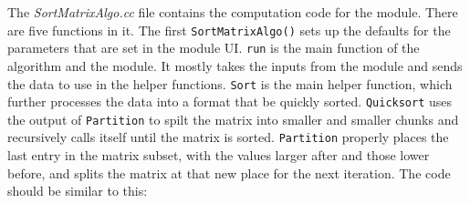 \documentclass[fleqn,11pt,openany]{book}
\begin{document}
The \emph{SortMatrixAlgo.cc} file contains the computation code for the module.
There are five functions in it.
The first \verb|SortMatrixAlgo()| sets up the defaults for the parameters that are set in the module UI.
\verb|run| is the main function of the algorithm and the module.  
It mostly takes the inputs from the module and sends the data to use in the helper functions.
\verb|Sort| is the main helper function, which further processes the data into a format that be quickly sorted.  
\verb|Quicksort| uses the output of \verb|Partition| to spilt the matrix into smaller and smaller chunks and recursively calls itself until the matrix is sorted.
\verb|Partition| properly places the last entry in the matrix subset, with the values larger after and those lower before, and splits the matrix at that new place for the next iteration.  
The code should be similar to this:
\end{document}
